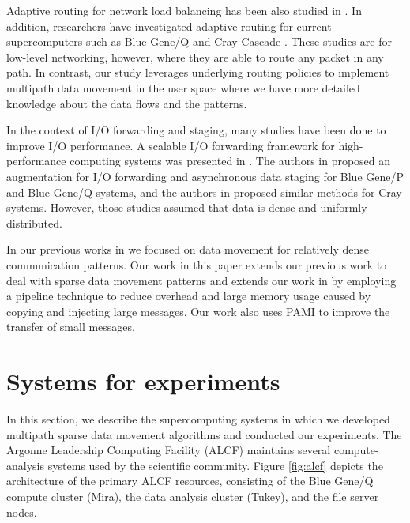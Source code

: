 \documentclass[final,5p,times]{elsarticle}
\begin{document}
Adaptive routing for network load balancing has been also studied in \cite{Valiant:Routing,singh2003:goal}. 
In addition, researchers have investigated adaptive routing for current supercomputers such as  Blue Gene/Q \cite{Chen:BGQ} and Cray Cascade \cite{garcia2013:CrayDragonfly}. These studies are for low-level networking, however, where they are able to route any packet in any path. In contrast, our study leverages underlying routing policies to implement multipath data movement in the user space where we have more detailed knowledge about the data flows and the patterns. 

In the context of I/O forwarding and staging, many studies have been done to improve I/O performance.   
A scalable I/O forwarding framework for high-performance computing systems was presented in \cite{Ali:IOForwarding,Iskra:IOForwarding}. The authors in \cite{Vishwanath:IOForwarding,Vishwanath:GLEAN} proposed an augmentation for I/O forwarding and asynchronous data staging for Blue Gene/P and Blue Gene/Q systems, and the authors in \cite{ADIOS} proposed similar methods for Cray systems. However, those studies assumed that data is dense and uniformly distributed.

In our previous works in \cite{hbui:bgq, SDAV:Bui2014b, hbui:optiq} we focused on data movement for relatively dense communication patterns. Our work in this paper extends our previous work \cite{Vishwanath:GLEAN} to deal with sparse data movement patterns and extends our work in \cite{Multipath:BGQ} by employing a pipeline technique to reduce overhead and large memory usage caused by copying and injecting large messages. Our work also uses PAMI to improve the transfer of small messages.

\section{Systems for experiments}
\label{sec:system}

In this section, we describe the supercomputing systems in which we developed multipath sparse data movement algorithms and conducted our experiments. The Argonne Leadership Computing Facility (ALCF) maintains several compute-analysis systems used by the scientific community. Figure \ref{fig:alcf} depicts the architecture of the primary ALCF resources, consisting of the Blue Gene/Q compute cluster (Mira), the data analysis cluster (Tukey), and the file server nodes.
\end{document}
